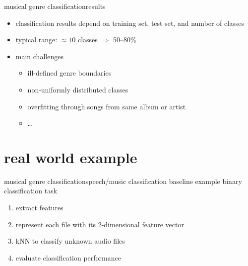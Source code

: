         \begin{frame}{musical genre classification}{results}
            \begin{itemize}
                \item	classification results depend on training set, test set, and number of classes
                \smallskip
                \item<2->	typical range: $\approx 10$ classes $\Rightarrow$ 50--80\%
                \bigskip
                \item<3-> main challenges
                    \begin{itemize}
                        \item   ill-defined genre boundaries
                        \item   non-uniformly distributed classes
                        \item   overfitting through songs from same album or artist
                        \item   \ldots
                    \end{itemize}
            \end{itemize}
        \end{frame}
    \section[example]{real world example}
        \begin{frame}{musical genre classification}{speech/music classification baseline example}
            binary classification task
            \begin{enumerate}
                \item	extract features
                \smallskip
                \item   represent each file with its 2-dimensional feature vector
                \smallskip
                \item   kNN to classify unknown audio files
                \smallskip
                \item   evaluate classification performance
            \end{enumerate}
        \end{frame}

